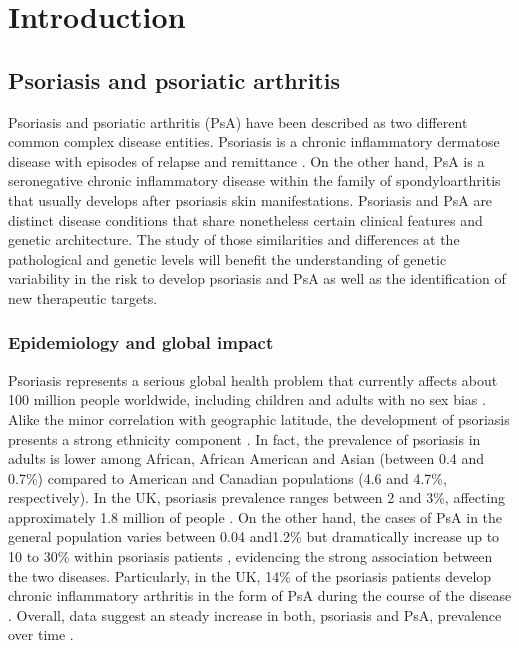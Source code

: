 \chapter{Introduction}
\label{ch:Intro}




\section{Psoriasis and psoriatic arthritis}
%
Psoriasis and psoriatic arthritis (PsA) have been described as two different common complex disease entities. Psoriasis is a chronic inflammatory dermatose disease with episodes of relapse and remittance \parencite{Nestle2009}. On the other hand, PsA is a seronegative chronic inflammatory disease within the family of spondyloarthritis \parencite{Moll1973, Coates2016} that usually develops after psoriasis skin manifestations\parencite{Villanova2016}. Psoriasis and PsA are distinct disease conditions that share nonetheless certain clinical features and genetic architecture. The study of those similarities and differences at the pathological and genetic levels will benefit the understanding of genetic variability in the risk to develop psoriasis and PsA as well as the identification of new therapeutic targets.


\subsection{Epidemiology and global impact}
%
Psoriasis represents a serious global health problem that currently affects about 100 million people worldwide, including children and adults with no sex bias \parencite{Organization2016}. Alike the minor correlation with geographic latitude, the development of psoriasis presents a strong ethnicity component \parencite{Jacobson2011}. In fact, the prevalence of psoriasis in adults is lower among African, African American and Asian (between 0.4 and 0.7\%) compared to American and Canadian populations (4.6 and 4.7\%, respectively). In the UK, psoriasis prevalence ranges between 2 and 3\%, affecting approximately 1.8 million of people \parencite{Perera2012}. On the other hand, the cases of PsA in the general population varies between 0.04 and1.2\% \parencite{Perera2012} but dramatically increase up to 10 to 30\% within psoriasis patients \parencite{Gelfand2005,Reich2008}, evidencing the strong association between the two diseases. Particularly, in the UK, 14\% of the psoriasis patients develop chronic inflammatory arthritis in the form of PsA during the course of the disease \parencite{Ibrahim2009}. Overall, data suggest an steady increase in both, psoriasis and PsA, prevalence over time \parencite{Springate2007,Organization2016}.

